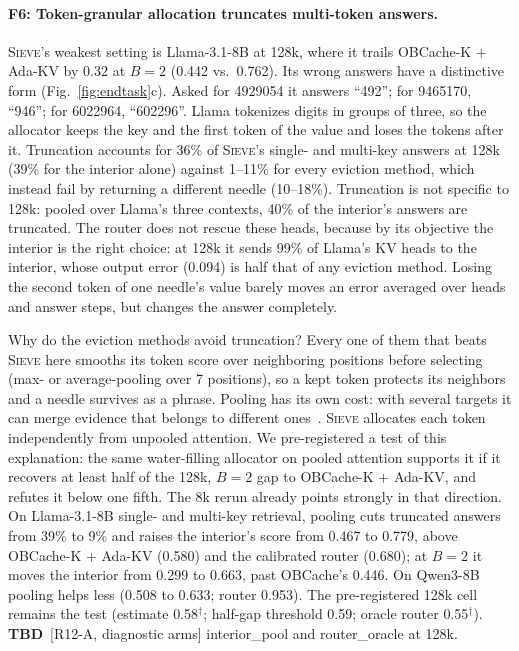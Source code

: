 \documentclass{article}
\newcommand{\tbd}[1]{{\color{tbdcol}\textbf{TBD}~#1}}
\newcommand{\est}[1]{{\color{estcol}#1$^{\dagger}$}}
\newcommand{\sieve}{\textsc{Sieve}}
\theoremstyle{definition}
\begin{document}
\paragraph{F6: Token-granular allocation truncates multi-token answers.}
\sieve{}'s weakest setting is Llama-3.1-8B at 128k, where it trails OBCache-K + Ada-KV by $0.32$ at $B=2$ (0.442 vs.\ 0.762).  Its wrong answers have a distinctive form (Fig.~\ref{fig:endtask}c).  Asked for 4929054 it answers ``492''; for 9465170, ``946''; for 6022964, ``602296''.  Llama tokenizes digits in groups of three, so the allocator keeps the key and the first token of the value and loses the tokens after it.  Truncation accounts for 36\% of \sieve{}'s single- and multi-key answers at 128k (39\% for the interior alone) against 1--11\% for every eviction method, which instead fail by returning a different needle (10--18\%).  Truncation is not specific to 128k: pooled over Llama's three contexts, 40\% of the interior's answers are truncated.  The router does not rescue these heads, because by its objective the interior is the right choice: at 128k it sends 99\% of Llama's KV heads to the interior, whose output error (0.094) is half that of any eviction method.  Losing the second token of one needle's value barely moves an error averaged over heads and answer steps, but changes the answer completely.

Why do the eviction methods avoid truncation?  Every one of them that beats \sieve{} here smooths its token score over neighboring positions before selecting (max- or average-pooling over 7 positions), so a kept token protects its neighbors and a needle survives as a phrase.  Pooling has its own cost: with several targets it can merge evidence that belongs to different ones~\citep{zhang2026fixedcontract}.  \sieve{} allocates each token independently from unpooled attention.  We pre-registered a test of this explanation: the same water-filling allocator on pooled attention supports it if it recovers at least half of the 128k, $B=2$ gap to OBCache-K + Ada-KV, and refutes it below one fifth.  The 8k rerun already points strongly in that direction.  On Llama-3.1-8B single- and multi-key retrieval, pooling cuts truncated answers from 39\% to 9\% and raises the interior's score from 0.467 to 0.779, above OBCache-K + Ada-KV (0.580) and the calibrated router (0.680); at $B=2$ it moves the interior from 0.299 to 0.663, past OBCache's 0.446.  On Qwen3-8B pooling helps less (0.508 to 0.633; router 0.953).  The pre-registered 128k cell remains the test (estimate \est{0.58}; half-gap threshold 0.59; oracle router \est{0.55}).  \tbd{[R12-A, diagnostic arms] interior\_pool and router\_oracle at 128k.}
\end{document}
